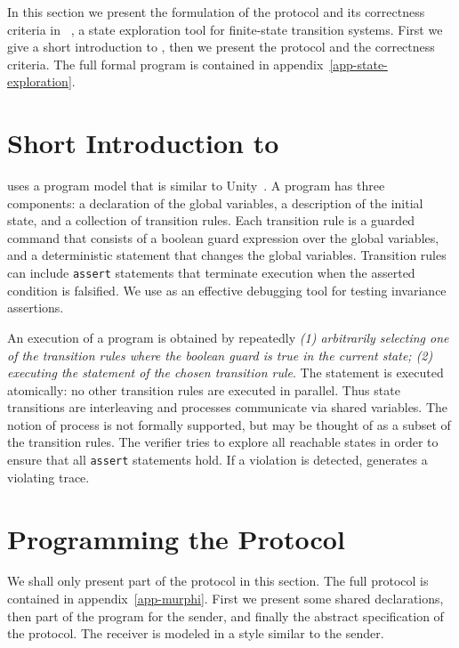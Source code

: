 

In this section  we present  the  formulation of the protocol  and its
correctness   criteria    in  \Murphi{}~\cite{MDC:Murphi},    a  state
exploration tool for finite-state transition systems.  First we give a
short introduction to  \Murphi, then we present  the protocol  and the
correctness criteria.  The full  formal \Murphi{} program is contained
in appendix~\ref{app-state-exploration}.

\section{Short Introduction to \Murphi}

\Murphi{} uses  a program model that is similar to
Unity~\cite{CM:UNITY}\@. A  \Murphi{}   program   has  three
components: a declaration  of the global  variables,  a description of
the initial   state, and  a collection   of transition   rules.   Each
transition rule is a guarded command that consists  of a boolean guard
expression over the global variables, and a deterministic statement that changes the
global variables.    Transition rules can include
{\tt  assert}  statements   that  terminate execution  when the asserted
condition is falsified.  We use \Murphi{} as an effective debugging tool
for testing invariance assertions.  

An execution of  a \Murphi{} program is  obtained  by repeatedly 
 {\it (1) arbitrarily   selecting one of the  transition  rules
where the boolean guard is true in the current state;  (2) executing the
statement of the chosen   transition rule}\@.   The statement  is executed
atomically: no other transition rules  are executed in parallel. 
Thus state transitions are interleaving and  processes
communicate  via  shared variables.   The   notion of process  is  not
formally  supported,  but may be   thought  of  as   a subset of   the
transition rules.  The \Murphi{} verifier tries to
explore all reachable states in order to ensure that all {\tt assert}
statements hold.  If a violation is detected, \Murphi{}
generates a violating trace.


\section{Programming the Protocol}

We shall only present part of the  protocol in this section.  The full
protocol is contained  in appendix~\ref{app-murphi}.  First we present
some shared declarations, then part of the program for the sender, and
finally the abstract specification  of the  protocol. The receiver  is
modeled in a style similar to the sender.



